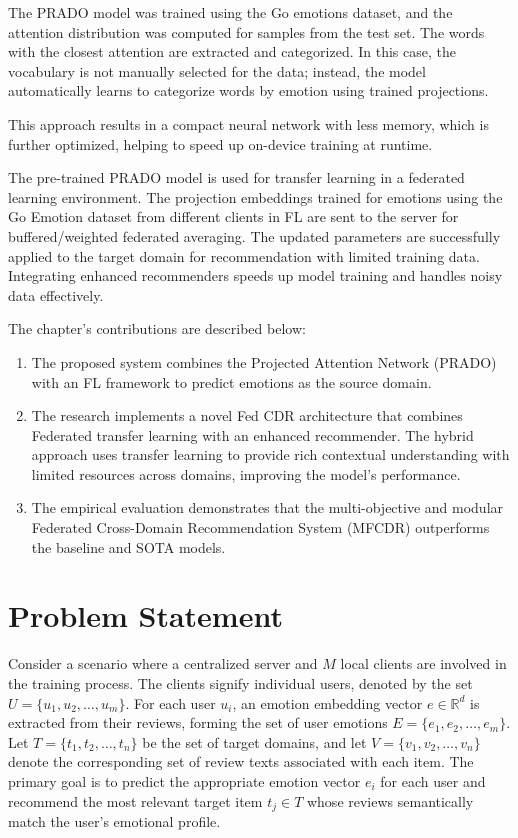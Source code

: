 The PRADO model was trained using the Go emotions dataset, and the attention distribution was computed for samples from the test set. The words with the closest attention are extracted and categorized. In this case, the vocabulary is not manually selected for the data; instead, the model automatically learns to categorize words by emotion using trained projections.

This approach results in a compact neural network with less memory, which is further optimized, helping to speed up on-device training at runtime.

The pre-trained PRADO model is used for transfer learning in a federated learning environment. The projection embeddings trained for emotions using the Go Emotion dataset from different clients in FL are sent to the server for buffered/weighted federated averaging. The updated parameters are successfully applied to the target domain for recommendation with limited training data. Integrating enhanced recommenders speeds up model training and handles noisy data effectively.

The chapter's contributions are described below:

\begin{enumerate}
    \item The proposed system combines the Projected Attention Network (PRADO) with an FL framework to predict emotions as the source domain.
    \item The research implements a novel Fed CDR architecture that combines Federated transfer learning with an enhanced recommender. The hybrid approach uses transfer learning to provide rich contextual understanding with limited resources across domains, improving the model's performance.
    \item The empirical evaluation demonstrates that the multi-objective and modular Federated Cross-Domain Recommendation System (MFCDR) outperforms the baseline and SOTA models.
\end{enumerate}

\section{Problem Statement}
Consider a scenario where a centralized server and $M$ local clients are involved in the training process. The clients signify individual users, denoted by the set $U = \{u_1, u_2, \ldots, u_m\}$. For each user $u_i$, an emotion embedding vector $e \in \mathbb{R}^{d}$ is extracted from their reviews, forming the set of user emotions $E = \{e_1, e_2, \ldots, e_m\}$. Let $T = \{t_1, t_2, \ldots, t_n\}$ be the set of target domains, and let $V = \{v_1, v_2, \ldots, v_n\}$ denote the corresponding set of review texts associated with each item. The primary goal is to predict the appropriate emotion vector $e_i$ for each user and recommend the most relevant target item $t_j \in T$ whose reviews semantically match the user's emotional profile.

